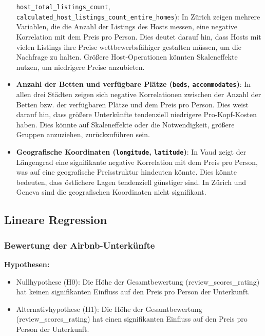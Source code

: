 \documentclass[
  journal,
]{IEEEtran}%
\providecommand{\tightlist}{%
  \setlength{\itemsep}{0pt}\setlength{\parskip}{0pt}}\usepackage{longtable,booktabs,array}
\begin{document}
\begin{itemize}
{  \texttt{host\_total\_listings\_count},
  \texttt{calculated\_host\_listings\_count\_entire\_homes})}: In Zürich
  zeigen mehrere Variablen, die die Anzahl der Listings des Hosts
  messen, eine negative Korrelation mit dem Preis pro Person. Dies
  deutet darauf hin, dass Hosts mit vielen Listings ihre Preise
  wettbewerbsfähiger gestalten müssen, um die Nachfrage zu halten.
  Größere Host-Operationen könnten Skaleneffekte nutzen, um niedrigere
  Preise anzubieten.
\item
  \textbf{Anzahl der Betten und verfügbare Plätze (\texttt{beds},
  \texttt{accommodates})}: In allen drei Städten zeigen sich negative
  Korrelationen zwischen der Anzahl der Betten bzw. der verfügbaren
  Plätze und dem Preis pro Person. Dies weist darauf hin, dass größere
  Unterkünfte tendenziell niedrigere Pro-Kopf-Kosten haben. Dies könnte
  auf Skaleneffekte oder die Notwendigkeit, größere Gruppen anzuziehen,
  zurückzuführen sein.
\item
  \textbf{Geografische Koordinaten (\texttt{longitude},
  \texttt{latitude})}: In Vaud zeigt der Längengrad eine signifikante
  negative Korrelation mit dem Preis pro Person, was auf eine
  geografische Preisstruktur hindeuten könnte. Dies könnte bedeuten,
  dass östlichere Lagen tendenziell günstiger sind. In Zürich und Geneva
  sind die geografischen Koordinaten nicht signifikant.
\end{itemize}

\subsection{\texorpdfstring{\textbf{Lineare
Regression}}{Lineare Regression}}\label{lineare-regression-1}

\subsubsection{Bewertung der
Airbnb-Unterkünfte}\label{bewertung-der-airbnb-unterkuxfcnfte}

\textbf{Hypothesen:}

\begin{itemize}
\tightlist
\item
  Nullhypothese (H0): Die Höhe der Gesamtbewertung
  (review\_scores\_rating) hat keinen signifikanten Einfluss auf den
  Preis pro Person der Unterkunft.
\item
  Alternativhypothese (H1): Die Höhe der Gesamtbewertung
  (review\_scores\_rating) hat einen signifikanten Einfluss auf den
  Preis pro Person der Unterkunft.
\end{itemize}
\end{document}
